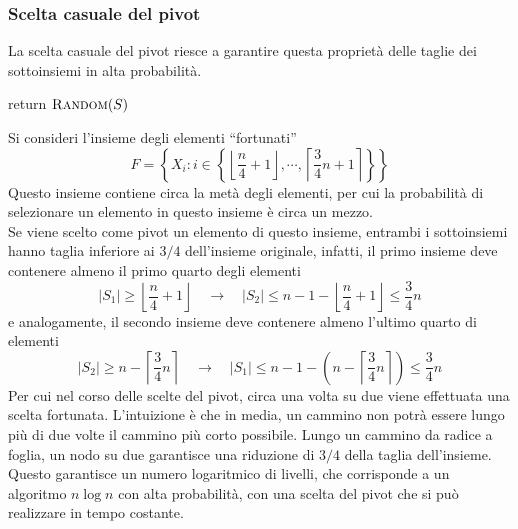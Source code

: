 \subsubsection{Scelta casuale del pivot}

La scelta casuale del pivot riesce a garantire questa proprietà delle taglie dei sottoinsiemi in alta probabilità.
\begin{algorithmic}[1]
        \State return $\Call{Random}{S}$
    \EndProcedure
\end{algorithmic}
Si consideri l'insieme degli elementi ``fortunati''
\begin{equation*}
    F = 
    \left\{ 
        X_i
        :
        i \in
        \left\{ 
            \left\lfloor 
            \frac{n}{4} + 1
            \right\rfloor
            , \cdots , 
            \left\lceil 
            \frac{3}{4}n + 1
            \right\rceil
        \right\}
    \right\}
\end{equation*}
Questo insieme contiene circa la metà degli elementi, per cui la probabilità di selezionare un elemento in questo insieme è circa un mezzo.
\\
Se viene scelto come pivot un elemento di questo insieme, entrambi i sottoinsiemi hanno taglia inferiore ai $3/4$ dell'insieme originale, infatti, il primo insieme deve contenere almeno il primo quarto degli elementi
\begin{equation*}
    |S_1| \geq
    \left\lfloor 
        \frac{n}{4} + 1
    \right\rfloor
    \quad
    \rightarrow
    \quad
    |S_2| \leq
    n - 1 -
    \left\lfloor 
        \frac{n}{4} + 1
    \right\rfloor
    \leq
    \frac{3}{4} n
\end{equation*}
e analogamente, il secondo insieme deve contenere almeno l'ultimo quarto di elementi
\begin{equation*}
    |S_2| \geq
    n -
    \left\lceil 
    \frac{3}{4}n
    \right\rceil
    \quad
    \rightarrow
    \quad
    |S_1| \leq n - 1 - \left( 
        n -
        \left\lceil 
        \frac{3}{4}n
        \right\rceil
    \right)
    \leq
    \frac{3}{4}n
\end{equation*}
Per cui nel corso delle scelte del pivot, circa una volta su due viene effettuata una scelta fortunata.
L'intuizione è che in media, un cammino non potrà essere lungo più di due volte il cammino più corto possibile.
Lungo un cammino da radice a foglia, un nodo su due garantisce una riduzione di $3/4$ della taglia dell'insieme.
Questo garantisce un numero logaritmico di livelli, che corrisponde a un algoritmo $n \log n$ con alta probabilità, con una scelta del pivot che si può realizzare in tempo costante.

